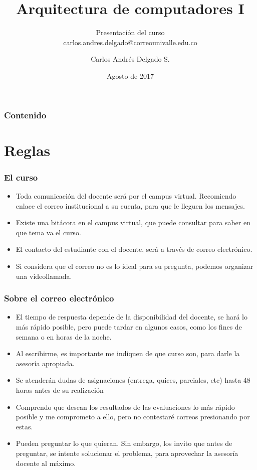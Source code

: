 \documentclass{beamer}
\author{Carlos Andr\'es Delgado S.}
\title{Arquitectura de computadores I}
\subtitle{Presentación del curso \\ carlos.andres.delgado@correounivalle.edu.co}
\institute{Facultad de Ingeniería. Universidad del Valle}
\date{Agosto de 2017}
\begin{document}
	\begin{frame}
		\titlepage	 		
	\end{frame}
	\begin{frame}
 		\frametitle{Contenido}
		\tableofcontents
	\end{frame}
	

	\section{Reglas}
	\begin{frame}
		\frametitle{El curso}
		\begin{itemize}
			\item Toda comunicación del docente será por el campus virtual. Recomiendo enlace el correo institucional a su cuenta, para que le lleguen los mensajes.
			\item Existe una bitácora en el campus virtual, que puede consultar para saber en que tema va el curso.
			\item El contacto del estudiante con el docente, será a través de correo electrónico.
			\item Si considera que el correo no es lo ideal para su pregunta, podemos organizar una videollamada.
		\end{itemize}
	\end{frame}	
	
	\begin{frame}
		\frametitle{Sobre el correo electrónico}
		\begin{itemize}
			\item El tiempo de respuesta depende de la disponibilidad del docente, se hará lo más rápido posible, pero puede tardar en algunos casos, como los fines de semana o en horas de la noche.
			\item Al escribirme, es importante me indiquen de que curso son, para darle la asesoría apropiada.
			\item Se atenderán dudas de asignaciones (entrega, quices, parciales, etc) hasta 48 horas antes de su realización
			\item Comprendo que desean los resultados de las evaluaciones lo más rápido posible y me comprometo a ello, pero no contestaré correos presionando por estas.
			\item Pueden preguntar lo que quieran. Sin embargo, los invito que antes de preguntar, se intente solucionar el problema, para aprovechar la asesoría docente al máximo.
		\end{itemize}
	\end{frame}	
\end{document}
